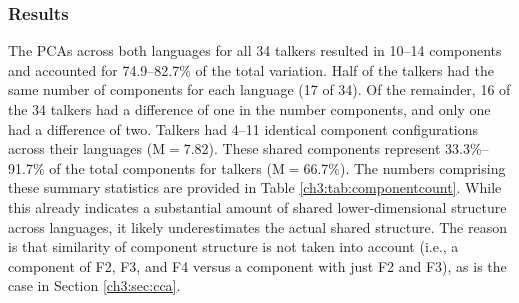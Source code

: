 \subsubsection{Results}\label{ch3:sec:pca_results} 

The PCAs across both languages for all 34 talkers resulted in 10--14 components and accounted for 74.9--82.7\% of the total variation. Half of the talkers had the same number of components for each language (17 of 34). Of the remainder, 16 of the 34 talkers had a difference of one in the number components, and only one had a difference of two. Talkers had 4--11 identical component configurations across their languages (M$=$7.82). These shared components represent 33.3\%--91.7\% of the total components for talkers (M$=$66.7\%). The numbers comprising these summary statistics are provided in Table \ref{ch3:tab:componentcount}. While this already indicates a substantial amount of shared lower-dimensional structure across languages, it likely underestimates the actual shared structure. The reason is that similarity of component structure is not taken into account (i.e., a component of F2, F3, and F4 versus a component with just F2 and F3), as is the case in Section \ref{ch3:sec:cca}. 

